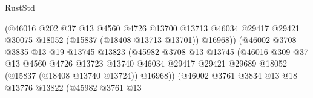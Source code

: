 \begin{lexlean}{RustStd}
\begin{coremodule}
{\begin{coremodule}
{{{{{{{{{{{{{{{{{{{{{{{{{{{{{{{{{{{{{{{{{{{{{{{{{{{{{{{{{{{{                                          (@46016
                                            @202
                                            @37
                                            @13
                                            @4560
                                            @4726
                                            @13700
                                            @13713
                                            @46034
                                            @29417
                                            @29421
                                            @30075
                                            @18052
                                            (@15837 (@18408 @13713 @13701))
                                            @16968))
                                        (@46002
                                          @3708
                                          @3835
                                          @13
                                          @19
                                          @13745
                                          @13823
                                          (@45982
                                            @3708
                                            @13
                                            @13745
                                            (@46016
                                              @309
                                              @37
                                              @13
                                              @4560
                                              @4726
                                              @13723
                                              @13740
                                              @46034
                                              @29417
                                              @29421
                                              @29689
                                              @18052
                                              (@15837 (@18408 @13740 @13724))
                                              @16968))
                                          (@46002
                                            @3761
                                            @3834
                                            @13
                                            @18
                                            @13776
                                            @13822
                                            (@45982
                                              @3761
                                              @13
}}}}}}}}}}}}}}}}}}}}}}}}}}}}}}}}}}}}}}}}}}}}}}}}}}}}}}}}}}}}
\end{coremodule}}
\end{coremodule}
\end{lexlean}

